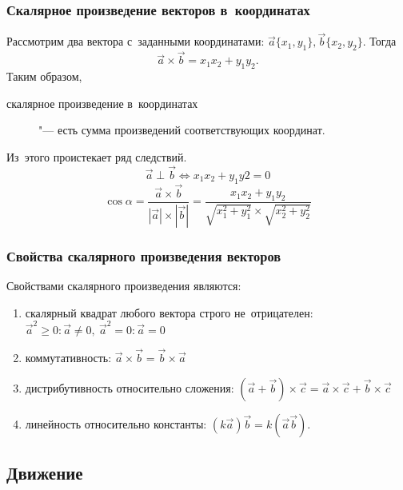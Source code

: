 \documentclass[]{scrartcl}
\begin{document}
\subsubsection{Скалярное произведение векторов в~координатах}
Рассмотрим два вектора с~заданными координатами: ${\textstyle \vec{a}\{x_{1},y_1{}\},\vec{b}\{x_{2},y_{2}\}}$. Тогда
\begin{equation}\label{eq:scalar-product-of-vectors-3}
\vec{a}\times \vec{b} = x_{1}x_{2}+y_{1}y_{2}.
\end{equation}
Таким образом,
\begin{description}
	\item[скалярное произведение в~координатах]  "--- есть сумма произведений соответствующих координат. 
\end{description}
Из~этого проистекает ряд следствий.
\begin{equation}\label{eq:scalar-product-of-vectors-4}
\vec{a} \perp \vec{b} \Leftrightarrow x_{1}x_{2}+y_{1}y{2} = 0
\end{equation}
\begin{equation}\label{eq:scalar-product-of-vectors-5}
\cos \alpha = \frac{\vec{a} \times \vec{b}}{|\vec{a}|\times |\vec{b}|} = \frac{x_{1}x_{2}+y_{1}y_{2}}{\sqrt{x_{1}^{2}+y_{1}^2}\times \sqrt{x_{2}^{2}+y_{2}^2}}
\end{equation}

\subsubsection{Свойства скалярного произведения векторов}
Свойствами скалярного произведения являются:
\begin{enumerate}
	\item скалярный квадрат любого вектора строго не~отрицателен: ${\textstyle \vec{a}^2 \geq 0: \vec{a} \neq 0,\ \vec{a}^2 = 0: \vec{a} = 0}$
	\item коммутативность: ${\textstyle \vec{a} \times \vec{b} = \vec{b} \times \vec{a}}$
	\item дистрибутивность относительно сложения: ${\textstyle (\vec{a}+\vec{b})\times \vec{c} = \vec{a} \times \vec{c} + \vec{b} \times \vec{c}}$
	\item линейность относительно константы: ${\textstyle (k\vec{a})\vec{b}=k(\vec{a}\vec{b})}$.  	
\end{enumerate}

\subsection{Движение}
\end{document}
